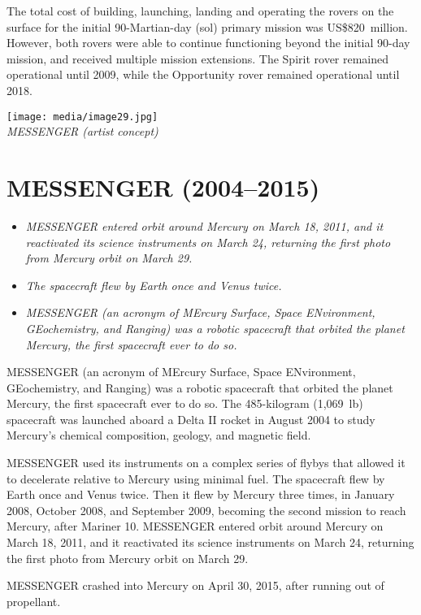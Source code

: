 The total cost of building, launching, landing and operating the rovers
on the surface for the initial 90-Martian-day (sol) primary mission was
US\$820~million. However, both rovers were able to continue functioning
beyond the initial 90-day mission, and received multiple mission
extensions. The Spirit rover remained operational until 2009, while the
Opportunity rover remained operational until 2018.

\texttt{[image: media/image29.jpg]}\\
\emph{MESSENGER (artist concept)}

\section{MESSENGER (2004--2015)}\label{messenger-20042015}

\begin{itemize}
\item
  \emph{MESSENGER entered orbit around Mercury on March 18, 2011, and it
  reactivated its science instruments on March 24, returning the first
  photo from Mercury orbit on March 29.}
\item
  \emph{The spacecraft flew by Earth once and Venus twice.}
\item
  \emph{MESSENGER (an acronym of MErcury Surface, Space ENvironment,
  GEochemistry, and Ranging) was a robotic spacecraft that orbited the
  planet Mercury, the first spacecraft ever to do so.}
\end{itemize}

MESSENGER (an acronym of MErcury Surface, Space ENvironment,
GEochemistry, and Ranging) was a robotic spacecraft that orbited the
planet Mercury, the first spacecraft ever to do so. The 485-kilogram
(1,069~lb) spacecraft was launched aboard a Delta II rocket in August
2004 to study Mercury's chemical composition, geology, and magnetic
field.

MESSENGER used its instruments on a complex series of flybys that
allowed it to decelerate relative to Mercury using minimal fuel. The
spacecraft flew by Earth once and Venus twice. Then it flew by Mercury
three times, in January 2008, October 2008, and September 2009, becoming
the second mission to reach Mercury, after Mariner 10. MESSENGER entered
orbit around Mercury on March 18, 2011, and it reactivated its science
instruments on March 24, returning the first photo from Mercury orbit on
March 29.

MESSENGER crashed into Mercury on April 30, 2015, after running out of
propellant.

